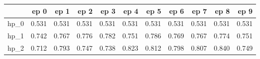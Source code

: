\begin{tabular}{lrrrrrrrrrr}
\toprule
{} &   ep 0 &   ep 1 &   ep 2 &   ep 3 &   ep 4 &   ep 5 &   ep 6 &   ep 7 &   ep 8 &   ep 9 \\
\midrule
hp\_0 &  0.531 &  0.531 &  0.531 &  0.531 &  0.531 &  0.531 &  0.531 &  0.531 &  0.531 &  0.531 \\
hp\_1 &  0.742 &  0.767 &  0.776 &  0.782 &  0.751 &  0.786 &  0.769 &  0.767 &  0.774 &  0.751 \\
hp\_2 &  0.712 &  0.793 &  0.747 &  0.738 &  0.823 &  0.812 &  0.798 &  0.807 &  0.840 &  0.749 \\
\bottomrule
\end{tabular}
